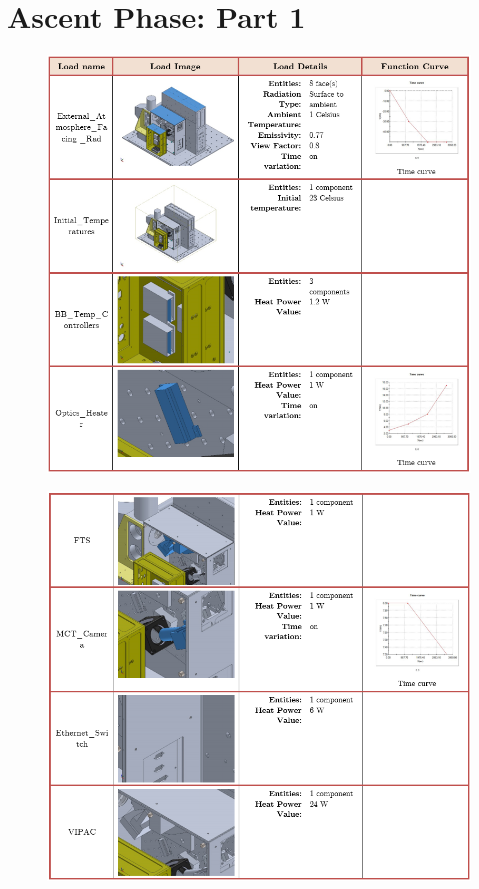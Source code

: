 \section{Ascent Phase: Part 1}

\begin{figure}[h!]
    \centering
    \includegraphics[width=\textwidth]{thermal_load_images/ascent_pt1_TL_images/ascesnt_pt1_1.PNG}
\end{figure}

\begin{figure}
    \centering
    \includegraphics[width=\textwidth]{thermal_load_images/ascent_pt1_TL_images/ascesnt_pt1_2.png}
\end{figure}

